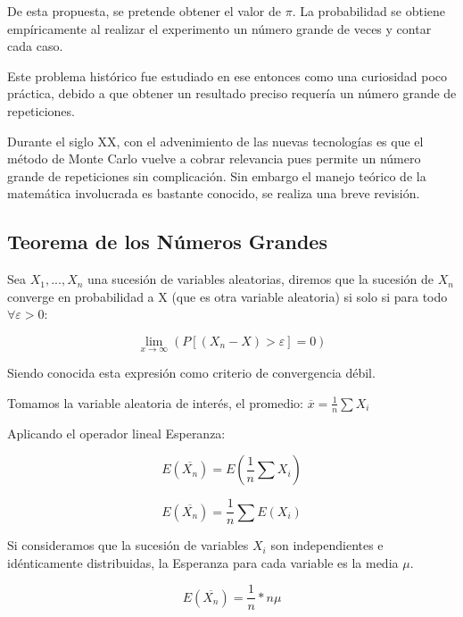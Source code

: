 \documentclass{rbf}
\begin{document}
De esta propuesta, se pretende obtener el valor de $\pi$. La probabilidad se obtiene empíricamente al realizar el experimento un número grande de veces y contar cada caso.

Este problema histórico fue estudiado en ese entonces como una curiosidad poco práctica, debido a que obtener un resultado preciso requería un número grande de repeticiones. 

Durante el siglo XX, con el advenimiento de las nuevas tecnologías es que el método de Monte Carlo vuelve a cobrar relevancia pues permite un número grande de repeticiones sin complicación. Sin embargo el manejo teórico de la matemática involucrada es bastante conocido, se realiza una breve revisión.

\subsection{Teorema de los Números Grandes}

Sea $X_1,..., X_n$ una sucesión de variables aleatorias, diremos que la sucesión de ${X_n}$ converge en probabilidad a X (que es otra variable aleatoria) si solo si para todo $\forall \varepsilon >0$:

\begin{equation}
   \displaystyle \lim_{x \to \infty}(P[(X_n - X)>\varepsilon]=0)
\end{equation}

Siendo conocida esta expresión como criterio de convergencia débil. 

Tomamos la variable aleatoria de interés, el promedio:
$\overline{x}=\frac{1}{n}\sum X_i$  

Aplicando el operador lineal Esperanza:

\begin{equation}
  \displaystyle  E(\overline{X_n})=E(\frac{1}{n} \sum X_i)
\end{equation}

\begin{equation}
  \displaystyle  E(\overline{X_n})=\frac{1}{n} \sum E(X_i)
\end{equation}

Si consideramos que la sucesión de variables $X_i$ son independientes e idénticamente distribuidas, la Esperanza para cada variable es la media $\mu$.

\begin{equation}
  \displaystyle  E(\overline{X_n})=\frac{1}{n} *n\mu
\end{equation}
\end{document}
